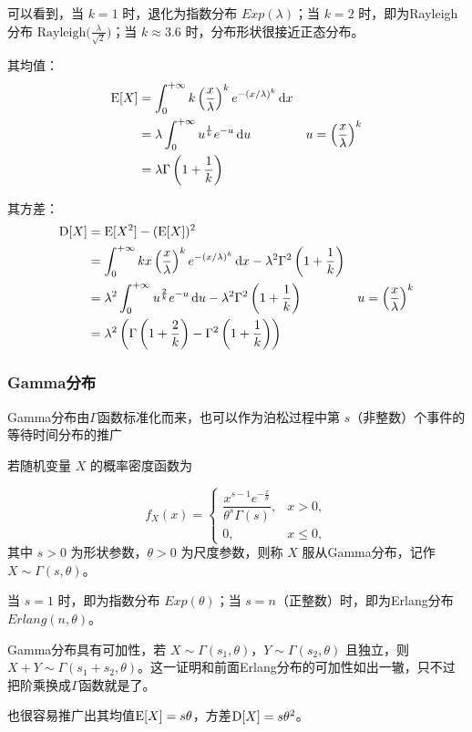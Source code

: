 可以看到，当 $k = 1$ 时，退化为指数分布 $Exp(\lambda)$；当 $k = 2$ 时，即为Rayleigh分布 $\mathrm{Rayleigh}\bigl(\frac{\lambda}{\sqrt{2}}\bigr)$；当 $k \approx 3.6$ 时，分布形状很接近正态分布。

其均值：
\begin{align*}
\operatorname{E}[X] &= \int_0^{+\infty} k \left( \dfrac{x}{\lambda} \right)^{k} e^{-(x/\lambda)^k}\mathop{}\!\mathrm{d} x \\
&= \lambda\int_0^{+\infty} u^{\frac{1}{k}} e^{-u}\mathop{}\!\mathrm{d} u & u=\left(\frac{x}{\lambda}\right)^k \\
&= \lambda\Gamma\left(1+\frac{1}{k}\right)
\end{align*}

其方差：
\begin{align*}
\operatorname{D}[X] &= \operatorname{E}[X^2]-(\operatorname{E}[X])^2 \\
&= \int_0^{+\infty} kx \left( \dfrac{x}{\lambda} \right)^{k} e^{-(x/\lambda)^k}\mathop{}\!\mathrm{d} x - \lambda^2\Gamma^2\left(1+\frac{1}{k}\right)\\
&= \lambda^2\int_0^{+\infty} u^{\frac{2}{k}} e^{-u}\mathop{}\!\mathrm{d} u - \lambda^2\Gamma^2\left(1+\frac{1}{k}\right) & u=\left(\frac{x}{\lambda}\right)^k\\
&= \lambda^2\left(\Gamma\left(1+\frac{2}{k}\right)- \Gamma^2\left(1+\frac{1}{k}\right)\right)
\end{align*}

\subsubsection{Gamma分布}
Gamma分布由$\Gamma$函数标准化而来，也可以作为泊松过程中第 $s$（非整数）个事件的等待时间分布的推广

若随机变量 $X$ 的概率密度函数为

\[
f_X(x) = \begin{cases}
    \dfrac{x^{s-1} e^{-\frac{x}{\theta}}}{\theta^s \Gamma(s)}, & x > 0,\\[10pt]
    0, & x \le 0,
\end{cases}
\]
其中 $s > 0$ 为形状参数，$\theta > 0$ 为尺度参数，则称 $X$ 服从Gamma分布，记作 $X \sim \Gamma(s, \theta)$。

当 $s = 1$ 时，即为指数分布 $Exp(\theta)$；当 $s = n$（正整数）时，即为Erlang分布 $Erlang(n, \theta)$。

Gamma分布具有可加性，若 $X \sim \Gamma(s_1, \theta)$，$Y \sim \Gamma(s_2, \theta)$ 且独立，则 $X + Y \sim \Gamma(s_1 + s_2, \theta)$。这一证明和前面Erlang分布的可加性如出一辙，只不过把阶乘换成$\Gamma$函数就是了。

也很容易推广出其均值$\operatorname{E}[X]=s\theta$，方差$\operatorname{D}[X]=s\theta^2$。

